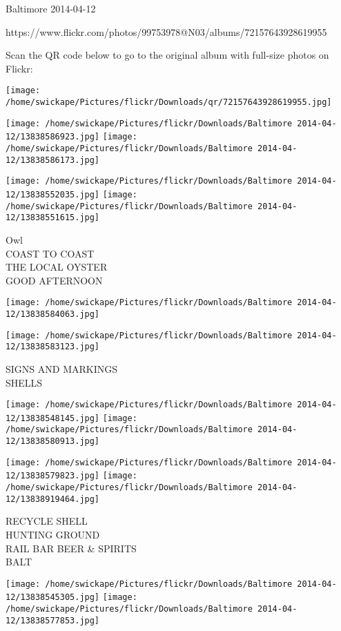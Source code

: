 \documentclass[10pt,letterpaper]{article}
\begin{document}
Baltimore 2014-04-12

https://www.flickr.com/photos/99753978@N03/albums/72157643928619955

Scan the QR code below to go to the original album with full-size photos on Flickr:

\texttt{[image: /home/swickape/Pictures/flickr/Downloads/qr/72157643928619955.jpg]}
\pagebreak

\texttt{[image: /home/swickape/Pictures/flickr/Downloads/Baltimore 2014-04-12/13838586923.jpg]}
\texttt{[image: /home/swickape/Pictures/flickr/Downloads/Baltimore 2014-04-12/13838586173.jpg]}

\texttt{[image: /home/swickape/Pictures/flickr/Downloads/Baltimore 2014-04-12/13838552035.jpg]}
\texttt{[image: /home/swickape/Pictures/flickr/Downloads/Baltimore 2014-04-12/13838551615.jpg]}

Owl\\
COAST TO COAST\\
THE LOCAL OYSTER\\
GOOD AFTERNOON
\pagebreak

\texttt{[image: /home/swickape/Pictures/flickr/Downloads/Baltimore 2014-04-12/13838584063.jpg]}

\vspace{0.25in}
\texttt{[image: /home/swickape/Pictures/flickr/Downloads/Baltimore 2014-04-12/13838583123.jpg]}

SIGNS AND MARKINGS\\
SHELLS
\pagebreak

\texttt{[image: /home/swickape/Pictures/flickr/Downloads/Baltimore 2014-04-12/13838548145.jpg]}
\texttt{[image: /home/swickape/Pictures/flickr/Downloads/Baltimore 2014-04-12/13838580913.jpg]}

\texttt{[image: /home/swickape/Pictures/flickr/Downloads/Baltimore 2014-04-12/13838579823.jpg]}
\texttt{[image: /home/swickape/Pictures/flickr/Downloads/Baltimore 2014-04-12/13838919464.jpg]}

RECYCLE SHELL\\
HUNTING GROUND\\
RAIL BAR BEER \& SPIRITS\\
BALT
\pagebreak

\texttt{[image: /home/swickape/Pictures/flickr/Downloads/Baltimore 2014-04-12/13838545305.jpg]}
\texttt{[image: /home/swickape/Pictures/flickr/Downloads/Baltimore 2014-04-12/13838577853.jpg]}
\end{document}
